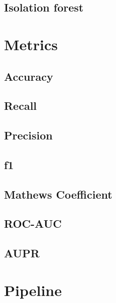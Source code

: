 \documentclass{article}
\begin{document}
\subsection{Isolation forest}
\section{Metrics}
\subsection{Accuracy}
\subsection{Recall}
\subsection{Precision}
\subsection{f1}
\subsection{Mathews Coefficient}
\subsection{ROC-AUC}
\subsection{AUPR}
\section{Pipeline}
\begin{figure}
	
\end{figure}





\end{document}
